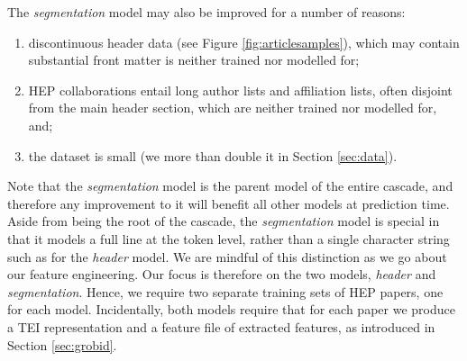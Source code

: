 The \emph{segmentation} model may also be improved for a number of reasons:

\begin{enumerate}
\item discontinuous header data (see Figure \ref{fig:articlesamples}), which may contain substantial front matter is neither trained nor modelled for;
\item HEP collaborations entail long author lists and affiliation lists, often disjoint from the main header section, which are neither trained nor modelled for, and;
\item the dataset is small (we more than double it in Section \ref{sec:data}).
\end{enumerate}

Note that the \emph{segmentation} model is the parent model of the entire cascade, and therefore any improvement to it will benefit all other models at prediction time. Aside from being the root of the cascade, the \emph{segmentation} model is special in that it models a full line at the token level, rather than a single character string such as for the \emph{header} model. We are mindful of this distinction as we go about our feature engineering. Our focus is therefore on the two models, \emph{header} and \emph{segmentation}. Hence, we require two separate training sets of HEP papers, one for each model. Incidentally, both models require that for each paper we produce a TEI representation and a feature file of extracted features, as introduced in Section \ref{sec:grobid}.

